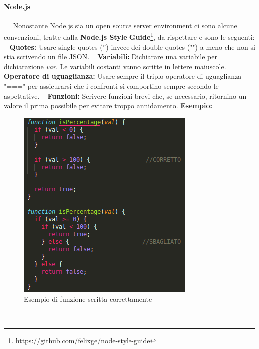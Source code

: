 	\paragraph{Node.js} ~\newline ~\newline
	Nonostante Node.js sia un open source server environment ci sono alcune convenzioni, tratte dalla \textbf{Node.js Style Guide}\footnote{\url{https://github.com/felixge/node-style-guide}}, da rispettare e sono le seguenti:
	\newline
	~\newline
	\textbf{Quotes:} Usare single quotes ('') invece dei double quotes ("") a meno che non si stia scrivendo un file JSON.
	\newline
	~\newline
	\textbf{Variabili:} Dichiarare una variabile per dichiarazione \textit{var}. Le variabili costanti vanno scritte in lettere maiuscole.
	\newline
	~\newline
	\textbf{Operatore di uguaglianza:} Usare sempre il triplo operatore di uguaglianza "===" per assicurarsi che i confronti si comportino sempre secondo le aspettative.
	\newline
	~\newline
	\textbf{Funzioni:} Scrivere funzioni brevi che, se necessario, ritornino un valore il prima possibile per evitare troppo annidamento.\newline
	\textbf{Esempio:}\newline
	\begin{figure}[!htbp]
		\centering
		\includegraphics[scale=0.5]{funzioneNodejs.png}
		\caption{Esempio di funzione scritta correttamente}
	\end{figure}
	~\newline
